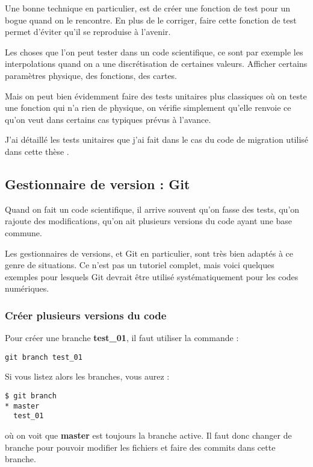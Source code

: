 \begin{remarque}
Une bonne technique en particulier, est de créer une fonction de test pour un bogue quand on le rencontre. En plus de le corriger, faire cette fonction de test permet d'éviter qu'il se reproduise à l'avenir. 
\end{remarque}

Les choses que l'on peut tester dans un code scientifique, ce sont par exemple les interpolations quand on a une discrétisation de certaines valeurs. Afficher certains paramètres physique, des fonctions, des cartes. 

Mais on peut bien évidemment faire des tests unitaires plus classiques où on teste une fonction qui n'a rien de physique, on vérifie simplement qu'elle renvoie ce qu'on veut dans certains cas typiques prévus à l'avance. 

J'ai détaillé les tests unitaires que j'ai fait dans le cas du code de migration utilisé dans cette thèse .

\subsection{Gestionnaire de version : Git}
Quand on fait un code scientifique, il arrive souvent qu'on fasse des tests, qu'on rajoute des modifications, qu'on ait plusieurs versions du code ayant une base commune. 

Les gestionnaires de versions, et Git en particulier, sont très bien adaptés à ce genre de situations. Ce n'est pas un tutoriel complet, mais voici quelques exemples pour lesquels Git devrait être utilisé systématiquement pour les codes numériques.

\subsubsection{Créer plusieurs versions du code}
Pour créer une branche \textbf{test\_01}, il faut utiliser la commande :
\begin{verbatim}
git branch test_01
\end{verbatim}

Si vous listez alors les branches, vous aurez :
\begin{verbatim}
$ git branch
* master
  test_01
\end{verbatim}
où on voit que \textbf{master} est toujours la branche active. Il faut donc changer de branche pour pouvoir modifier les fichiers et faire des commits dans cette branche.

